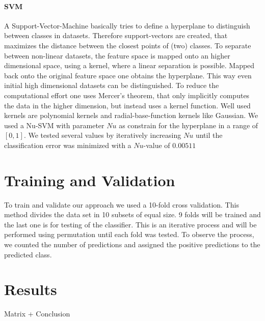 \documentclass[a4paper,10pt]{article}
\begin{document}
\paragraph{SVM}
A Support-Vector-Machine basically tries to define a hyperplane to distinguish between classes in datasets. Therefore support-vectors are created, that maximizes the distance between the closest points of (two) classes. To separate between non-linear datasets, the feature space is mapped onto an higher dimensional space, using a kernel, where a linear separation is possible. Mapped back onto the original feature space one obtains the hyperplane. This way even initial high dimensional datasets can be distinguished. To reduce the computational effort one uses Mercer's theorem, that only implicitly computes the data in the higher dimension, but instead uses a kernel function. Well used kernels are polynomial kernels and radial-base-function kernels like Gaussian. We used a Nu-SVM with parameter $Nu$ as constrain for the hyperplane in a range of $[0,1]$. We tested several values by iteratively increasing $Nu$ until the classification error was minimized with a $Nu$-value of $0.00511$ 

\section{Training and Validation}
To train and validate our approach we used a 10-fold cross validation. 
This method divides the data set in 10 subsets of equal size. 9 folds will be trained and the last one is for testing of the classifier.
This is an iterative process and will be performed using permutation until each fold was tested.
To observe the process, we counted the number of predictions and assigned the positive predictions to the predicted class.
\section{Results}
Matrix + Conclusion 
\end{document}
